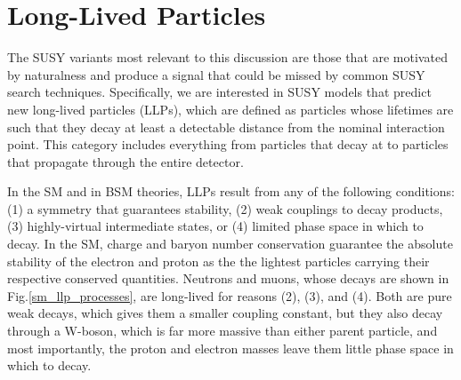 \documentclass[12pt]{article}
\begin{document}
\section{Long-Lived Particles}
    The SUSY variants most relevant to this discussion are those that are motivated by naturalness and  produce a signal that could be missed by common SUSY search techniques. Specifically, we are interested in SUSY models that predict new long-lived particles (LLPs), which are defined as particles whose lifetimes are such that they decay at least a detectable distance from the nominal interaction point. This category includes everything from particles that decay at  to particles that propagate through the entire detector. 

    In the SM and in BSM theories, LLPs result from any of the following conditions: (1) a symmetry that guarantees stability, (2) weak couplings to decay products, (3) highly-virtual intermediate states, or (4) limited phase space in which to decay. In the SM, charge and baryon number conservation guarantee the absolute stability of the electron and proton as the the lightest particles carrying their respective conserved quantities. Neutrons and muons, whose decays are shown in Fig.\ref{sm_llp_processes}, are long-lived for reasons (2), (3), and (4). Both are pure weak decays, which gives them a smaller coupling constant, but they also decay through a W-boson, which is far more massive than either parent particle, and most importantly, the proton and electron masses leave them little phase space in which to decay.   
\end{document}

